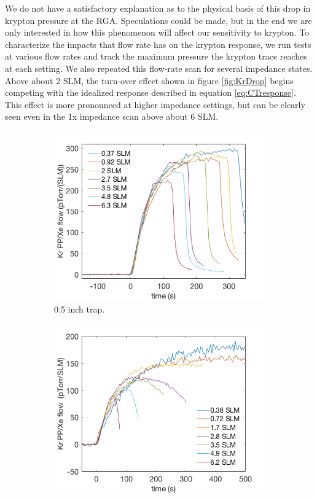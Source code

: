 \documentclass[12pt]{article}
\begin{document}
We do not have a satisfactory explanation as to the physical basis of this drop in krypton pressure at the RGA. Speculations could be made, but in the end we are only interested in how this phenomenon will affect our sensitivity to krypton. To characterize the impacts that flow rate has on the krypton response, we run tests at various flow rates and track the maximum pressure the krypton trace reaches at each setting. We also repeated this flow-rate scan for several impedance states. Above about 2 SLM, the turn-over effect shown in figure \ref{fig:KrDrop} begins competing with the idealized response described in equation \ref{eq:CTresponse}. This effect is more pronounced at higher impedance settings, but can be clearly seen even in the 1x impedance scan above about 6 SLM.
\begin{figure}[h!]
\centering
\begin{subfigure}{0.5\textwidth}
  \centering
  \includegraphics[width=\textwidth]{Figures/SLAC_FlowResponse_15x.png}
  \caption{0.5 inch trap.}
  \label{fig:flow_traces_0p5}
\end{subfigure}%
\begin{subfigure}{0.5\textwidth}
  \centering
  \includegraphics[width=\textwidth]{Figures/SLAC_FlowResponse_15x_1p5in.png}

\end{subfigure}
\end{figure}
\end{document}
